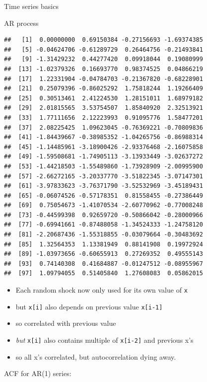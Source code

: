 \documentclass[ignorenonframetext,]{beamer}
\newenvironment{Shaded}{\begin{snugshade}}{\end{snugshade}}
\newcommand{\DataTypeTok}[1]{\textcolor[rgb]{0.13,0.29,0.53}{#1}}
\newcommand{\KeywordTok}[1]{\textcolor[rgb]{0.13,0.29,0.53}{\textbf{#1}}}
\newcommand{\NormalTok}[1]{#1}
\newcommand{\OperatorTok}[1]{\textcolor[rgb]{0.81,0.36,0.00}{\textbf{#1}}}
\newcommand{\StringTok}[1]{\textcolor[rgb]{0.31,0.60,0.02}{#1}}
\providecommand{\tightlist}{%
  \setlength{\itemsep}{0pt}\setlength{\parskip}{0pt}}
\begin{document}
\begin{frame}[fragile]{Time series basics}
\begin{block}{AR process}
\begin{verbatim}
##   [1]  0.00000000  0.69150384 -0.27156693 -1.69374385
##   [5] -0.04624706 -0.61289729  0.26464756 -0.21493841
##   [9] -1.31429232  0.44277420  0.09918044  0.19080999
##  [13] -1.02379326  0.16693770  0.98374525  0.04866219
##  [17]  1.22331904 -0.04784703 -0.21367820 -0.68228901
##  [21]  0.25079396 -0.86025292  1.75818244  1.19266409
##  [25]  0.30513461  2.41224530  1.28151011  1.68979182
##  [29]  2.01815565  3.53754507  1.85840920  2.32513921
##  [33]  1.77111656  2.12223993  0.91095776  1.58477201
##  [37]  2.08225425  1.09623045 -0.76369221 -0.70809836
##  [41] -1.84439667 -0.38985352 -1.04265756 -0.86988314
##  [45] -1.14485961 -3.18900426 -2.93376468 -2.16075858
##  [49] -1.59508681 -1.74905113 -3.13933449 -3.02637272
##  [53] -1.44218503 -1.55489860 -1.73928909 -2.00995900
##  [57] -2.66272165 -3.20337770 -3.51822345 -3.07147301
##  [61] -3.97833623 -3.76371790 -3.52532969 -3.45189431
##  [65] -0.06074526 -0.57178351  0.81558455 -0.27386449
##  [69]  0.75054673 -1.41070534 -2.60770962 -0.77008248
##  [73] -0.44599398  0.92659720 -0.50866042 -0.28000966
##  [77] -0.69941661 -0.87488058 -1.34524333 -1.24758120
##  [81] -2.20687436 -1.55318855 -0.03079664 -0.30483692
##  [85]  1.32564353  1.13381949  0.88141908  0.19972924
##  [89] -1.03973656 -0.60655913  0.27269352  0.49555143
##  [93]  0.74140308  0.41684887 -0.01247512 -0.08955967
##  [97]  1.09794055  0.51405840  1.27608083  0.05862015
\end{verbatim}

\begin{itemize}
\tightlist
\item
  Each random shock now only used for its own value of \texttt{x}
\item
  but \texttt{x{[}i{]}} also depends on previous value
  \texttt{x{[}i-1{]}}
\item
  so correlated with previous value
\item
  \emph{but} \texttt{x{[}i{]}} also contains multiple of
  \texttt{x{[}i-2{]}} and previous x's
\item
  so all x's correlated, but autocorrelation dying away.
\end{itemize}

ACF for AR(1) series:

\begin{Shaded}
\end{Shaded}


\end{block}
\end{frame}
\end{document}
